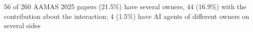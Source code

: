 56 of 260 AAMAS 2025 papers (21.5\%) have several owners, 44 (16.9\%) with the contribution about the interaction; 4 (1.5\%) have AI agents of different owners on several sides